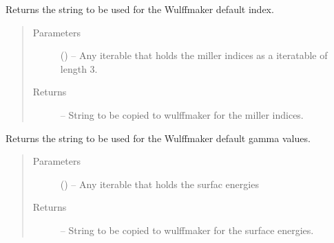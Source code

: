 \documentclass[letterpaper,10pt,english,openany,oneside]{sphinxmanual}
\begin{document}

\begin{fulllineitems}
\label{\detokenize{index:ogre.utils.wulffmaker.wulffmaker_index}}
Returns the string to be used for the Wulffmaker default index.
\begin{quote}\begin{description}
\item[{Parameters}] \leavevmode
{} () -- Any iterable that holds the miller indices as a iteratable of length 3.

\item[{Returns}] \leavevmode
{} -- String to be copied to wulffmaker for the miller indices.

\end{description}\end{quote}

\end{fulllineitems}


\begin{fulllineitems}
\label{\detokenize{index:ogre.utils.wulffmaker.wulffmaker_gamma}}
Returns the string to be used for the Wulffmaker default gamma values.
\begin{quote}\begin{description}
\item[{Parameters}] \leavevmode
{} () -- Any iterable that holds the surfac energies

\item[{Returns}] \leavevmode
{} -- String to be copied to wulffmaker for the surface energies.

\end{description}\end{quote}

\end{fulllineitems}
\end{document}
